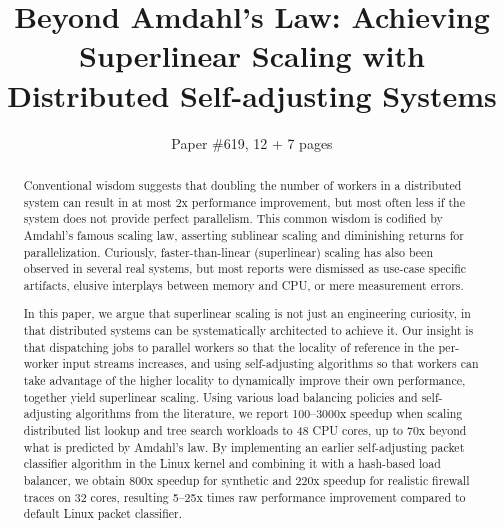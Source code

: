 \documentclass[letterpaper,twocolumn,10pt]{article}
\begin{document}


\title{Beyond Amdahl's Law: Achieving Superlinear Scaling with\\Distributed Self-adjusting Systems}

\author{Paper \#619, 12 + 7 pages}

\maketitle

\begin{abstract}
  Conventional wisdom suggests that doubling the number of workers in a distributed system can result in at most 2x performance improvement, but most often less if the system does not provide perfect parallelism.  This common wisdom is codified by Amdahl's famous scaling law, asserting sublinear scaling and diminishing returns for parallelization. Curiously, faster-than-linear (superlinear) scaling has also been observed in several real systems, but most reports were dismissed as use-case specific artifacts, elusive interplays between memory and CPU, or mere measurement errors.

  In this paper, we argue that superlinear scaling is not just an engineering curiosity, in that distributed systems can be systematically architected to achieve it. Our insight is that dispatching jobs to parallel workers so that the locality of reference in the per-worker input streams increases, and using self-adjusting algorithms so that workers can take advantage of the higher locality to dynamically improve their own performance, together yield superlinear scaling. Using various load balancing policies and self-adjusting algorithms from the literature, we report 100--3000x speedup when scaling distributed list lookup and tree search workloads to 48 CPU cores, up to 70x beyond what is predicted by Amdahl's law. By implementing an earlier self-adjusting packet classifier algorithm in the Linux kernel and combining it with a hash-based load balancer, we obtain 800x speedup for synthetic and 220x speedup for realistic firewall traces on 32 cores, resulting 5--25x times raw performance improvement compared to default Linux packet classifier.
\end{abstract}
\end{document}
